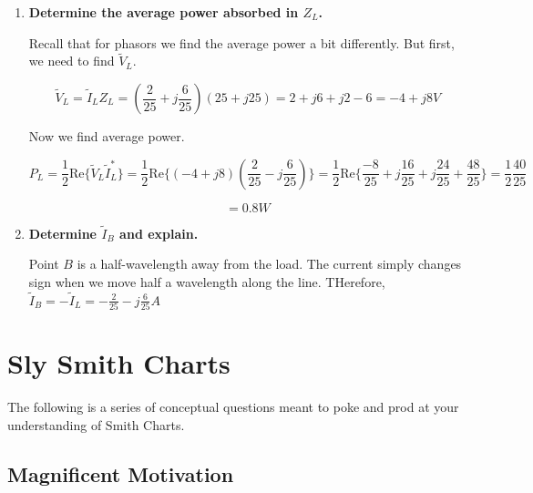 \documentclass{article}
\begin{document}
\begin{enumerate}
    Recall that the current forcing formula works when we want to find the current a quarter-wavelength towards the source from a position where we know the voltage. We use it here, taking the answer from the previous part.

    $$\tilde{I}_L = -j \frac{\tilde{V}_A}{Z_0} = -j \left(\frac{-12 + j4}{50}\right)$$

    $$= \boxed{\frac{2}{25} + j\frac{6}{25} A}$$

    \vfill
    
    \item \textbf{Determine the average power absorbed in $Z_L$.}

    Recall that for phasors we find the average power a bit differently. But first, we need to find $\tilde{V}_L$.

    $$\tilde{V}_L = \tilde{I}_L Z_L = \left(\frac{2}{25} + j\frac{6}{25}\right)\left(25 + j25 \right) = 2 + j6 + j2 - 6 = -4 + j8 V$$

    Now we find average power.

    $$P_L = \frac{1}{2} \text{Re}\{\tilde{V}_L \tilde{I}_L^*\} = \frac{1}{2} \text{Re}\{(-4 + j8) \left(\frac{2}{25} - j\frac{6}{25}\right)\} = \frac{1}{2} \text{Re}\{\frac{-8}{25} + j\frac{16}{25} + j\frac{24}{25} + \frac{48}{25}\} = \frac{1}{2} \frac{40}{25}$$

    $$= \boxed{0.8 W}$$

    \vfill
    
    \item \textbf{Determine $\tilde{I}_B$ and explain.}

    Point $B$ is a half-wavelength away from the load. The current simply changes sign when we move half a wavelength along the line. THerefore, $\tilde{I}_B = -\tilde{I}_L = \boxed{-\frac{2}{25} - j\frac{6}{25} A}$

    \vfill
    \newpage
    
\end{enumerate}

\newpage

\section{Sly Smith Charts}
\label{section:smith_chart}

The following is a series of conceptual questions meant to poke and prod at your understanding of Smith Charts.

\subsection{Magnificent Motivation}
\end{document}
